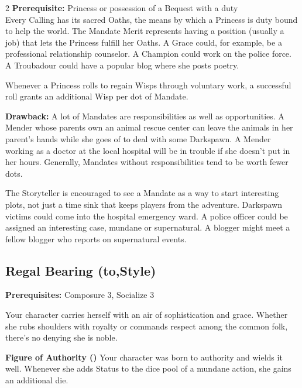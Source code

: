 \begin{multicols}{2}
\textbf{Prerequisite:} Princess or possession of a Bequest with a duty \\

\noindent Every Calling has its sacred Oaths, the means by which a Princess is duty bound to help the world. The Mandate Merit represents having a position (usually a job) that lets the Princess fulfill her Oaths. A Grace could, for example, be a professional relationship counselor. A Champion could work on the police force. A Troubadour could have a popular blog where she posts poetry. 

Whenever a Princess rolls to regain Wisps through voluntary work, a successful roll grants an additional Wisp per dot of Mandate.

\textbf{Drawback:} A lot of Mandates are responsibilities as well as opportunities. A Mender whose parents own an animal rescue center can leave the animals in her parent's hands while she goes of to deal with some Darkspawn. A Mender working as a doctor at the local hospital will be in trouble if she doesn’t put in her hours. Generally, Mandates without responsibilities tend to be worth fewer dots. 

The Storyteller is encouraged to see a Mandate as a way to start interesting plots, not just a time sink that keeps players from the adventure. Darkspawn victims could come into the hospital emergency ward. A police officer could be assigned an interesting case, mundane or supernatural. A blogger might meet a fellow blogger who reports on supernatural events. 

\subsection*{Regal Bearing (\textbullet\nobreak\hspace{.16667em}to\nobreak\hspace{.16667em}\textbullet\textbullet\textbullet\textbullet\textbullet,\nobreak\hspace{.16667em}Style)}

\textbf{Prerequisites:} Composure 3, Socialize 3

Your character carries herself with an air of sophistication and grace. Whether she rubs shoulders with royalty or commands respect among the common folk, there's no denying she is noble.

\textbf{Figure of Authority (\textbullet)} Your character was born to authority and wields it well. Whenever she adds Status to the dice pool of a mundane action, she gains an additional die. 


\end{multicols}
